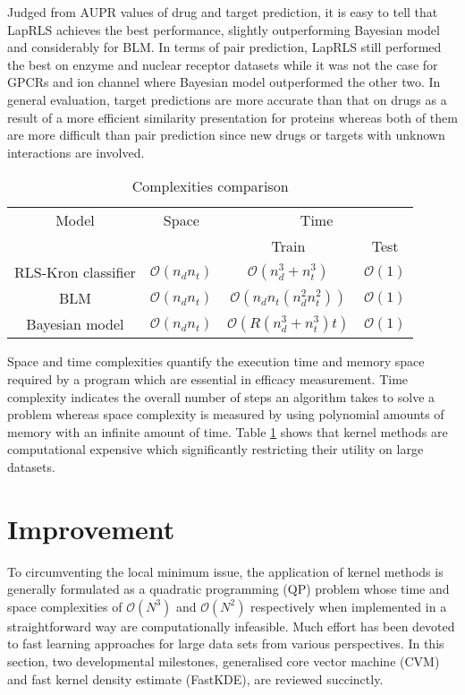 \documentclass[a4paper,12pt]{report}
\begin{document}
Judged from AUPR values of drug and target prediction, it is easy to tell that LapRLS achieves the best performance, slightly outperforming Bayesian model and considerably for BLM. In terms of pair prediction, LapRLS still performed the best on enzyme and nuclear receptor datasets while it was not the case for GPCRs and ion channel where Bayesian model outperformed the other two.
In general evaluation, target predictions are more accurate than that on drugs as a result of a more efficient similarity presentation for proteins whereas both of them are more difficult than pair prediction since new drugs or targets with unknown interactions are involved.

\begin{table}[h]
\centering
\begin{tabular}{cccc}\hline
Model & Space & \multicolumn{2}{c}{Time} \\
\cline{3-4} 
& & Train & Test\\
RLS-Kron classifier   & $\mathcal{O}(n_dn_t)$ & $\mathcal{O}(n^3_d + n^3_t)$ & $\mathcal{O}(1)$ \\
BLM & $\mathcal{O}(n_dn_t)$ & $\mathcal{O}(n_dn_t(n^2_dn^2_t))$ &$\mathcal{O}(1)$ \\
Bayesian model & $\mathcal{O}(n_dn_t)$ & $\mathcal{O}(R(n^3_d + n^3_t)t)$ & $\mathcal{O}(1)$

\end{tabular}
\caption{Complexities comparison}
\label{cc}
\end{table}

Space and time complexities quantify the execution time and memory space required by a program which are essential in efficacy measurement. Time complexity indicates the overall number of steps an algorithm takes to solve a problem whereas space complexity is measured by using polynomial amounts of memory with an infinite amount of time. Table \ref{cc} shows that kernel methods are computational expensive which significantly restricting their utility on large datasets.

\chapter{Improvement}

To circumventing the local minimum issue, the application of kernel methods is generally formulated as a quadratic programming (QP) problem whose time and space complexities of $\mathcal{O}(N^3)$ and $\mathcal{O}(N^2)$ respectively when implemented in a straightforward way are computationally infeasible. Much effort has been devoted to fast learning approaches for large data sets from various perspectives. In this section, two developmental milestones, generalised core vector machine (CVM) and fast kernel density estimate (FastKDE), are reviewed succinctly. 
\end{document}
